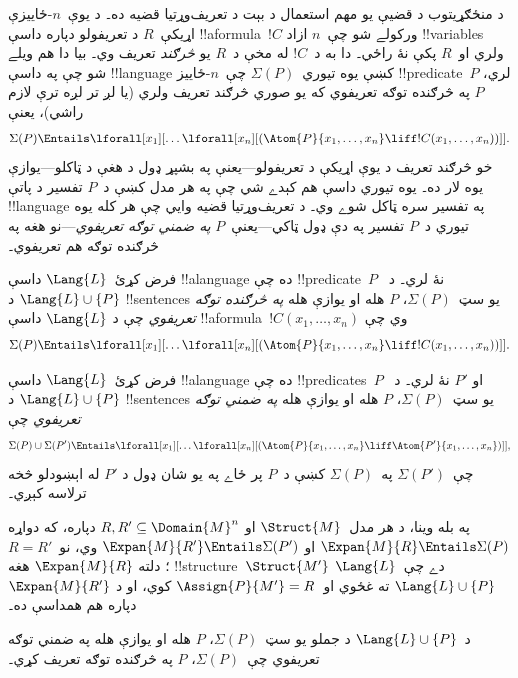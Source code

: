 \documentclass[../../../include/open-logic-section]{subfiles}
\begin{document}


د منځګړيتوب د قضيې يو مهم استعمال د بېت د تعريف‌وړتيا قضيه ده۔ د
يوې~$n$-ځاييزې اړيکې~$R$ د تعريفولو دپاره داسې !!a{formula}~$!C$
ورکولے شو چې~$n$ ازاد !!{variable}s ولري او~$R$ پکې نۀ راځي۔ دا به
د~$!C$ له مخې د~$R$ يو \emph{څرګند} تعريف وي۔ بيا دا هم ويلے شو چې
په داسې !!{language} کښې يوه تيوري~$\Sigma(P)$ چې~$n$-ځاييز
!!{predicate}~$P$ لري، $P$ په څرګنده توګه تعريفوي که يو صوري
څرګند تعريف ولري (يا لږ تر لږه ترې لازم راشي)، يعنې
\[
\Sigma(P) \Entails \lforall[x_1][\dots
  \lforall[x_n][(\Atom{P}{x_1,\dots, x_n} \liff !C(x_1, \dots,
    x_n))]].
\]
خو څرګند تعريف د يوې اړيکې د تعريفولو---يعنې په بشپړ ډول د هغې د
ټاکلو---يوازې يوه لار ده۔ يوه تيوري داسې هم کېدے شي چې په هر مدل
کښې د~$P$ تفسير د پاتې !!{language} په تفسير سره ټاکل شوے وي۔ د
تعريف‌وړتيا قضيه وايي چې هر کله يوه تيوري د~$P$ تفسير په دې ډول
ټاکي---يعنې~$P$ \emph{په ضمني توګه تعريفوي}---نو هغه په څرګنده
توګه هم تعريفوي۔

\begin{defn}
فرض کړئ~$\Lang{L}$ داسې !!a{language} ده چې !!{predicate}~$P$ نۀ
لري۔ د~$\Lang{L} \cup \{P\}$ د !!{sentence}s يو سټ~$\Sigma(P)$،
$P$ هله او يوازې هله \emph{په څرګنده توګه تعريفوي} چې د
$\Lang{L}$ داسې !!a{formula}~$!C(x_1, \dots, x_n)$ وي چې
\[
\Sigma(P) \Entails \lforall[x_1][\dots
  \lforall[x_n][(\Atom{P}{x_1,\dots, x_n} \liff !C(x_1, \dots,
    x_n))]].
\]
\end{defn}

\begin{defn}
فرض کړئ~$\Lang{L}$ داسې !!a{language} ده چې !!{predicate}s~$P$ او
$P'$ نۀ لري۔ د~$\Lang{L} \cup \{P\}$ د !!{sentence}s يو
سټ~$\Sigma(P)$، $P$ هله او يوازې هله \emph{په ضمني توګه تعريفوي}
چې
\[
\Sigma(P) \cup \Sigma(P') \Entails \lforall[x_1][\dots
  \lforall[x_n][(\Atom{P}{x_1,\dots, x_n} \liff \Atom{P'}{x_1,\dots,
      x_n})]],
\]
چې~$\Sigma(P')$ په~$\Sigma(P)$ کښې د~$P$ پر ځاے په يو شان ډول د
$P'$ له اېښودلو څخه ترلاسه کېږي۔
\end{defn}

په بله وينا، د هر مدل~$\Struct{M}$ او
$R, R' \subseteq \Domain{M}^n$ دپاره، که دواړه
$\Expan{M}{R} \Entails \Sigma(P)$ او
$\Expan{M}{R'} \Entails \Sigma(P')$ وي، نو~$R=R'$؛ دلته
$\Expan{M}{R}$ هغه !!{structure}~$\Struct{M'}$ دے چې~$\Lang{L}$
$\Lang{L} \cup \{P\}$ ته غځوي او~$\Assign{P}{M'} = R$ کوي، او د
$\Expan{M}{R'}$ دپاره هم همداسې ده۔

\begin{thm}
د~$\Lang{L} \cup\{P\}$ د جملو يو سټ~$\Sigma(P)$، $P$
هله او يوازې هله په ضمني توګه تعريفوي چې~$\Sigma(P)$، $P$ په
څرګنده توګه تعريف کړي۔
\end{thm}
\end{document}
